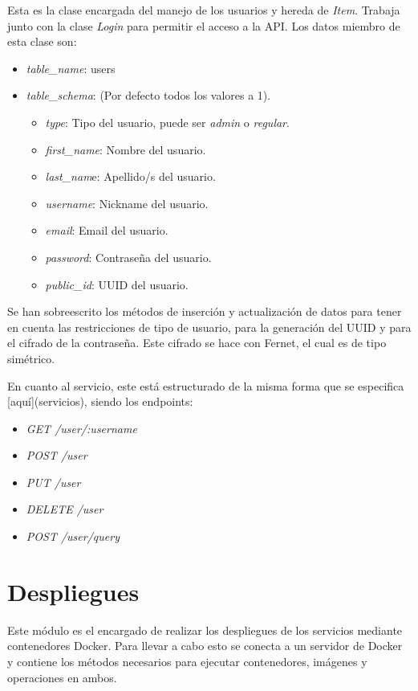 Esta es la clase encargada del manejo de los usuarios y hereda de \textit{Item}. Trabaja junto con la clase \textit{Login} para permitir el acceso a la API. Los datos miembro de esta clase son:
\begin{itemize}
	\item \textit{table\_name}: users
	\item \textit{table\_schema}: (Por defecto todos los valores a 1).
	\begin{itemize}
		\item \textit{type}: Tipo del usuario, puede ser \textit{admin} o \textit{regular}.
		\item \textit{first\_name}: Nombre del usuario.
		\item \textit{last\_nam}e: Apellido/s del usuario.
		\item \textit{username}: Nickname del usuario.
		\item \textit{email}: Email del usuario.
		\item \textit{password}: Contraseña del usuario.
		\item \textit{public\_id}: UUID del usuario.
	\end{itemize}
\end{itemize}


\bigskip
Se han sobreescrito los métodos de inserción y actualización de datos para tener en cuenta las restricciones de tipo de usuario, para la generación del UUID y para el cifrado de la contraseña. Este cifrado se hace con Fernet, el cual es de tipo simétrico.

\bigskip
En cuanto al servicio, este está estructurado de la misma forma que se especifica [aquí](servicios), siendo los endpoints:
\begin{itemize}
	\item \textit{GET /user/:username}
	\item \textit{POST /user}
	\item \textit{PUT /user}
	\item \textit{DELETE /user}
	\item \textit{POST /user/query}
\end{itemize}




\section{Despliegues}

Este módulo es el encargado de realizar los despliegues de los servicios mediante contenedores Docker. Para llevar a cabo esto se conecta a un servidor de Docker y contiene los métodos necesarios para ejecutar contenedores, imágenes y operaciones en ambos.

